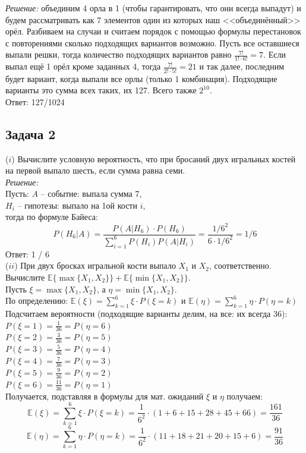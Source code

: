\documentclass[a4paper,12pt]{article} %
\begin{document}
\textit{Решение:} объединим 4 орла в 1 (чтобы гарантировать, что они всегда выпадут) и будем рассматривать как 7 элементов один из которых наш <<объединённый>> орёл. Разбиваем на случаи и считаем порядок с помощью формулы перестановок с повторениями сколько подходящих вариантов возможно. Пусть все оставшиеся выпали решки, тогда количество подходящих вариантов равно $ \frac{7!}{1! \cdot 6!} = 7 $. Если выпал ещё 1 орёл кроме заданных 4, тогда $ \frac{7!}{2! \cdot 5!} = 21 $ и так далее, последним будет вариант, когда выпали все орлы (только 1 комбинация). Подходящие варианты это сумма всех таких, их 127. Всего также $ 2^{10} $.\\
Ответ: 127/1024

\subsection*{Задача 2}
($i$) Вычислите условную вероятность, что при бросаний двух игральных костей на первой выпало шесть, если сумма равна семи.\\

\textit{Решение:}\\ Пусть: $ A $ -- событие: выпала сумма 7,\\
$ H_i $ -- гипотезы: выпало на 1ой кости $ i $,\\
тогда по формуле Байеса:
$$
P\left(H_{6} | A\right) = \frac{P\left(A | H_{6}\right) \cdot P\left(H_{6}\right)}{\sum\limits_{i=1}^{6} P\left(H_{i}\right) P\left(A | H_{i}\right)} = \frac{1 / 6^{2}}{6 \cdot 1 / 6^{2}}=1 / 6
$$
Ответ: 1 / 6\\

($ii$) При двух бросках игральной кости выпало $X_1$ и $X_2$, соответственно. Вычислите $\mathbb{E}\{\max\{X_1,X_2\}\} + \mathbb{E}\{\min\{X_1,X_2\}\}$.\\

Пусть $\xi = \max\{X_1,X_2\}$, а $ \eta =  \min\{X_1,X_2\}$. \\
По определению: $\mathbb{E}(\xi) = \sum\limits_{k=1}^{6} \xi \cdot P(\xi = k)$ и $ \mathbb{E}(\eta) = \sum\limits_{k=1}^{6} \eta \cdot P(\eta = k) $\\
Подсчитаем вероятности (подходящие варианты делим, на все: их всегда 36):\\
$ P(\xi = 1) = \frac{1}{36} = P(\eta = 6)$\\
$ P(\xi = 2) = \frac{3}{36} = P(\eta = 5)$\\
$ P(\xi = 3) = \frac{5}{36} = P(\eta = 4)$\\
$ P(\xi = 4) = \frac{7}{36} = P(\eta = 3)$\\
$ P(\xi = 5) = \frac{9}{36} = P(\eta = 2)$\\
$ P(\xi = 6) = \frac{11}{36} = P(\eta = 1)$\\
Получается, подставляя в формулы для мат. ожиданий $ \xi $ и $ \eta $ получаем:\\
$$\mathbb{E}(\xi) = \sum\limits_{k=1}^{6} \xi \cdot P(\xi = k) = \frac{1}{6^2} \cdot (1+6+15+28+45+66) = \frac{161}{36}$$
$$
\mathbb{E}(\eta) = \sum\limits_{k=1}^{6} \eta \cdot P(\eta = k) = \frac{1}{6^2} \cdot (11+18+21+20+15+6) = \frac{91}{36}
$$
\end{document}
